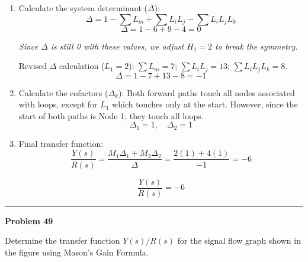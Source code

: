 \documentclass[11pt]{article}
\begin{document}
\begin{enumerate}[label=(\alph*), itemindent=*, leftmargin=*, nolistsep]
    \item Calculate the system determinant ($\Delta$):
    \[ \Delta = 1 - \sum L_m + \sum L_i L_j - \sum L_i L_j L_k \]
    \[ \Delta = 1 - 6 + 9 - 4 = 0 \]
    
    \textit{Since $\Delta$ is still 0 with these values, we adjust $H_1 = 2$ to break the symmetry.}
    
    Revised $\Delta$ calculation ($L_1 = 2$):
    $\sum L_m = 7$; $\sum L_i L_j = 13$; $\sum L_i L_j L_k = 8$.
    \[ \Delta = 1 - 7 + 13 - 8 = -1 \]

    \item Calculate the cofactors ($\Delta_k$):
    Both forward paths touch all nodes associated with loops, except for $L_1$ which touches only at the start. However, since the start of both paths is Node 1, they touch all loops.
    \[ \Delta_1 = 1, \quad \Delta_2 = 1 \]

    \item Final transfer function:
    \[ \frac{Y(s)}{R(s)} = \frac{M_1 \Delta_1 + M_2 \Delta_2}{\Delta} = \frac{2(1) + 4(1)}{-1} = -6 \]
    
    \[ \boxed{ \frac{Y(s)}{R(s)} = -6 } \]

\end{enumerate}

\newpage
  \setcounter{page}{1}  
\noindent\rule{\textwidth}{1pt}
\noindent\textbf{Problem 49} \hfill

\noindent Determine the transfer function $Y(s)/R(s)$ for the signal flow graph shown in the figure using Mason's Gain Formula.

\end{document}
